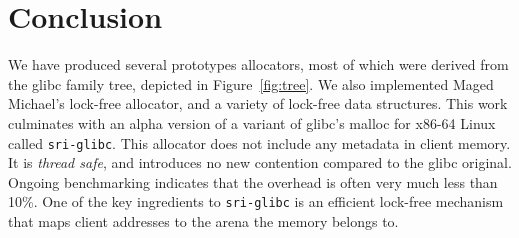 \documentclass[12pt]{cslreport}
\begin{document}





\chapter{Conclusion}

We  have produced  several prototypes allocators, most of which were
derived from the glibc family tree, depicted in Figure~\ref{fig:tree}.
We also implemented Maged Michael's lock-free allocator, and a variety
of lock-free data structures.
This work culminates with an alpha version of a variant of  glibc's malloc for
x86-64  Linux  called  \texttt{sri-glibc}.
This  allocator  does  not
include any metadata in client memory.  It is {\em thread safe\/}, and
introduces no new  contention compared to the  glibc original. Ongoing
benchmarking indicates that the overhead  is often very much less than
10\%.   One  of  the  key  ingredients  to  \texttt{sri-glibc}  is  an
efficient lock-free mechanism that maps  client addresses to the arena
the memory belongs to.





\end{document}
